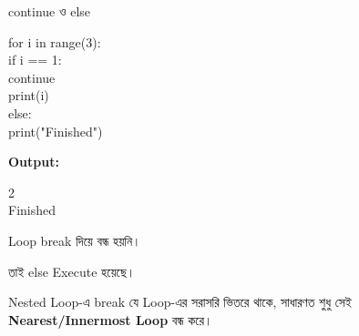 \begin{codeoutputbox}{\textenglish{\ttfamily continue} ও \textenglish{\ttfamily else}}

\noindent
\begin{minipage}[t]{0.53\linewidth}
\codeheading

\begin{english}
\ttfamily
for i in range(3):\\
\hspace*{4mm}if i == 1:\\
\hspace*{8mm}continue\\
\hspace*{4mm}print(i)\\
else:\\
\hspace*{4mm}print("Finished")
\end{english}

\end{minipage}
\hfill
\begin{minipage}[t]{0.43\linewidth}
\outputheading

\textbf{Output:}

\begin{english}
 2\\
Finished
\end{english}

\medskip

Loop
\textenglish{\ttfamily break}
দিয়ে বন্ধ হয়নি।

তাই
\textenglish{\ttfamily else}
Execute হয়েছে।

\end{minipage}

\end{codeoutputbox}



Nested Loop-এ
\textenglish{\ttfamily break}
যে Loop-এর সরাসরি ভিতরে থাকে,
সাধারণত শুধু সেই \textbf{Nearest/Innermost Loop} বন্ধ করে।

